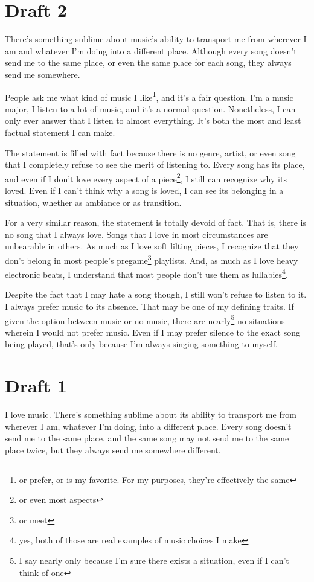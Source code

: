\documentclass[12pt]{article}[titlepage]
\newcommand{\1}{\={a}}
\newcommand{\2}{\={e}}
\newcommand{\3}{\={\i}}
\newcommand{\4}{\=o}
\newcommand{\5}{\=u}
\newcommand{\6}{\={A}}
\renewcommand{\,}{\textsuperscript{,}}
\begin{document}
\section{Draft 2}
There's something sublime about music's ability to transport me from wherever I am and whatever I'm doing into a different place.
Although every song doesn't send me to the same place, or even the same place for each song, they always send me somewhere.

People ask me what kind of music I like\footnote{or prefer, or is my favorite. For my purposes, they're effectively the same}, and it's a fair question.
I'm a music major, I listen to a lot of music, and it's a normal question.
Nonetheless, I can only ever answer that I listen to almost everything.
It's both the most and least factual statement I can make.

The statement is filled with fact because there is no genre, artist, or even song that I completely refuse to see the merit of listening to.
Every song has its place, and even if I don't love every aspect of a piece\footnote{or even most aspects}, I still can recognize why its loved.
Even if I can't think why a song is loved, I can see its belonging in a situation, whether as ambiance or as transition.

For a very similar reason, the statement is totally devoid of fact.
That is, there is no song that I always love.
Songs that I love in most circumstances are unbearable in others.
As much as I love soft lilting pieces, I recognize that they don't belong in most people's pregame\footnote{or meet} playlists.
And, as much as I love heavy electronic beats, I understand that most people don't use them as lullabies\footnote{yes, both of those are real examples of music choices I make}.

Despite the fact that I may hate a song though, I still won't refuse to listen to it.
I always prefer music to its absence.
That may be one of my defining traits.
If given the option between music or no music, there are nearly\footnote{I say nearly only because I'm sure there exists a situation, even if I can't think of one} no situations wherein I would not prefer music.
Even if I may prefer silence to the exact song being played, that's only because I'm always singing something to myself.

\section{Draft 1}
I love music.
There's something sublime about its ability to transport me from wherever I am, whatever I'm doing, into a different place.
Every song doesn't send me to the same place, and the same song may not send me to the same place twice, but they always send me somewhere different.
\end{document}
